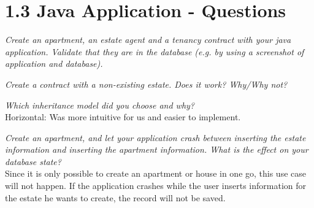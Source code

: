 \documentclass[ngerman]{dis-template-add}
\begin{document}
\section*{1.3 Java Application - Questions}

\textit{Create an apartment, an estate agent and a tenancy contract with your java application. Validate that they are in the database (e.g. by using a screenshot of application and database).}


\textit{Create a contract with a non-existing estate. Does it work? Why/Why not?
}

\textit{Which inheritance model did you choose and why?
} \\
Horizontal: Was more intuitive for us and easier to implement.

\textit{Create an apartment, and let your application crash between inserting the estate information and inserting the apartment information. What is the effect on your database state?
} \\
Since it is only possible to create an apartment or house in one go, this use case will not happen.
If the application crashes while the user inserts information for the estate he wants to create, the record will not be saved.
\end{document}
